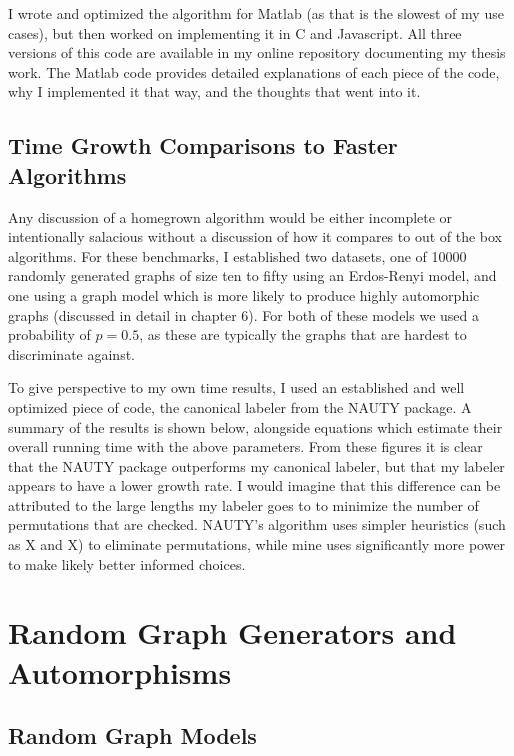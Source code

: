 \documentclass[11pt,a4paper]{report}
\begin{document}
I wrote and optimized the algorithm for Matlab (as that is the slowest of my use cases), but then worked on implementing it in C and Javascript.
All three versions of this code are available in my online repository documenting my thesis work.
The Matlab code provides detailed explanations of each piece of the code, why I implemented it that way, and the thoughts that went into it.

\section{Time Growth Comparisons to Faster Algorithms}
Any discussion of a homegrown algorithm would be either incomplete or intentionally salacious without a discussion of how it compares to out of the box algorithms.
For these benchmarks, I established two datasets, one of 10000 randomly generated graphs of size ten to fifty using an Erdos-Renyi model, and one using a graph model which is more likely to produce highly automorphic graphs (discussed in detail in chapter 6).
For both of these models we used a probability of $p=0.5$, as these are typically the graphs that are hardest to discriminate against.

To give perspective to my own time results, I used an established and well optimized piece of code, the canonical labeler from the NAUTY package.
A summary of the results is shown below, alongside equations which estimate their overall running time with the above parameters.
From these figures it is clear that the NAUTY package outperforms my canonical labeler, but that my labeler appears to have a lower growth rate.
I would imagine that this difference can be attributed to the large lengths my labeler goes to to minimize the number of permutations that are checked.
NAUTY's algorithm uses simpler heuristics (such as X and X) to eliminate permutations, while mine uses significantly more power to make likely better informed choices.



\chapter{Random Graph Generators and Automorphisms}

\section{Random Graph Models}
\end{document}
